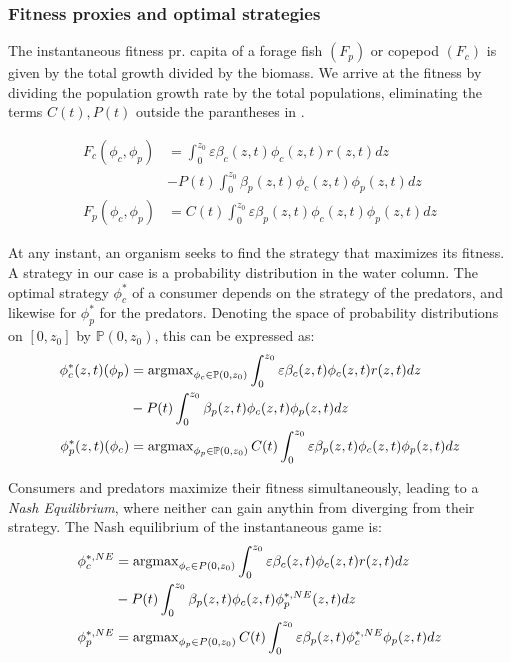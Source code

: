 \subsubsection*{Fitness proxies and optimal strategies}


The instantaneous fitness pr. capita of a forage fish $(F_p)$ or copepod $(F_c)$ is given by the total growth divided by the biomass. We arrive at the fitness by dividing the population growth rate  by the total populations, eliminating the terms $C(t), P(t)$ outside the parantheses in .

\begin{align}
	F_c(\phi_c, \phi_p) &= \int_0^{z_0} \varepsilon \beta_c(z,t)\phi_c(z,t)r(z,t) dz\\ &- P(t)\int_0^{z_0} \beta_p(z,t) \phi_c(z,t) \phi_p(z,t)dz \\
	F_p(\phi_c, \phi_p) &=  C(t) \int_0^{z_0} \varepsilon \beta_p(z,t)\phi_c(z,t)\phi_p(z,t) dz
\end{align}

At any instant, an organism seeks to find the strategy that maximizes its fitness. A strategy in our case is a probability distribution in the water column. The optimal strategy $\phi_c^*$ of a consumer depends on the strategy of the predators, and likewise for $\phi_p^*$ for the predators. Denoting the space of probability distributions on $[0,z_0]$ by $\mathbb{P}(0,z_0)$, this can be expressed as:
\begin{align}
	\phi_c^*(z,t)(\phi_p) &= \argmax_{\phi_c \in \mathbb{P}(0,z_0)}  \int_0^{z_0} \varepsilon \beta_c(z,t)\phi_c(z,t)r(z,t) dz \\ &- P(t)\int_0^{z_0} \beta_p(z,t) \phi_c(z,t) \phi_p(z,t)dz  \\
	\phi_p^*(z,t)(\phi_c) &= \argmax_{\phi_p \in \mathbb{P}(0,z_0)}C(t) \int_0^{z_0} \varepsilon \beta_p(z,t)\phi_c(z,t)\phi_p(z,t) dz
\end{align}

Consumers and predators maximize their fitness simultaneously, leading to a \emph{Nash Equilibrium}, where neither can gain anythin from diverging from their strategy. The Nash equilibrium of the instantaneous game is:
\begin{align}
  \label{eq:nash_equilibria}
	\phi_c^{*,NE} &=  \argmax_{\phi_c \in P(0,z_0)}  \int_0^{z_0} \varepsilon \beta_c(z,t)\phi_c(z,t)r(z,t) dz \\ &- P(t)\int_0^{z_0} \beta_p(z,t) \phi_c(z,t) \phi_p^{*,NE}(z,t) dz \\
	\phi_p^{*,NE} &=  \argmax_{\phi_p \in P(0,z_0)}C(t) \int_0^{z_0} \varepsilon \beta_p(z,t)\phi_c^{*,NE} \phi_p(z,t) dz
\end{align}

